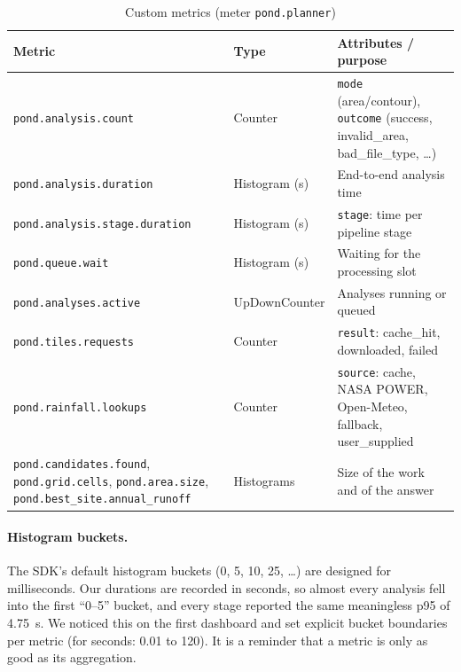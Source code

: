 \documentclass[manuscript,screen]{acmart}
\begin{document}
\begin{table}[h]
\caption{Custom metrics (meter \texttt{pond.planner})}
\label{tab:metrics}
\small
\begin{tabular}{>{\raggedright\arraybackslash}p{4.6cm}>{\raggedright\arraybackslash}p{2.3cm}>{\raggedright\arraybackslash}p{6.9cm}}
\toprule
Metric & Type & Attributes / purpose \\
\midrule
\texttt{pond.analysis.count} & Counter & \texttt{mode} (area/contour), \texttt{outcome} (success, invalid\_area, bad\_file\_type, \ldots) \\
\texttt{pond.analysis.duration} & Histogram (s) & End-to-end analysis time \\
\texttt{pond.analysis.stage.duration} & Histogram (s) & \texttt{stage}: time per pipeline stage \\
\texttt{pond.queue.wait} & Histogram (s) & Waiting for the processing slot \\
\texttt{pond.analyses.active} & UpDownCounter & Analyses running or queued \\
\texttt{pond.tiles.requests} & Counter & \texttt{result}: cache\_hit, downloaded, failed \\
\texttt{pond.rainfall.lookups} & Counter & \texttt{source}: cache, NASA POWER, Open-Meteo, fallback, user\_supplied \\
\texttt{pond.candidates.found}, \texttt{pond.grid.cells}, \texttt{pond.area.size}, \texttt{pond.best\_site.annual\_runoff} & Histograms & Size of the work and of the answer \\
\bottomrule
\end{tabular}
\end{table}

\paragraph{Histogram buckets.} The SDK's default histogram buckets
(0, 5, 10, 25, \ldots) are designed for milliseconds. Our durations are
recorded in seconds, so almost every analysis fell into the first
``0--5'' bucket, and every stage reported the same meaningless p95 of
4.75~s. We noticed this on the first dashboard and set explicit bucket
boundaries per metric (for seconds: 0.01 to 120). It is a reminder that a
metric is only as good as its aggregation.
\end{document}
